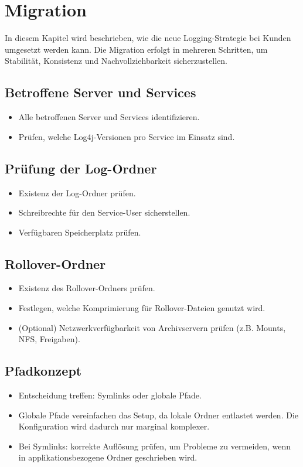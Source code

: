 \chapter{Migration}
\label{chap:migration}

In diesem Kapitel wird beschrieben, wie die neue Logging-Strategie bei Kunden umgesetzt werden kann.  
Die Migration erfolgt in mehreren Schritten, um Stabilität, Konsistenz und Nachvollziehbarkeit sicherzustellen.

\section{Betroffene Server und Services}
\begin{itemize}
    \item Alle betroffenen Server und Services identifizieren.
    \item Prüfen, welche Log4j-Versionen pro Service im Einsatz sind.
\end{itemize}

\section{Prüfung der Log-Ordner}
\begin{itemize}
    \item Existenz der Log-Ordner prüfen.
    \item Schreibrechte für den Service-User sicherstellen.
    \item Verfügbaren Speicherplatz prüfen.
\end{itemize}

\section{Rollover-Ordner}
\begin{itemize}
    \item Existenz des Rollover-Ordners prüfen.
    \item Festlegen, welche Komprimierung für Rollover-Dateien genutzt wird.
    \item (Optional) Netzwerkverfügbarkeit von Archivservern prüfen (z.B. Mounts, NFS, Freigaben).
\end{itemize}

\section{Pfadkonzept}
\begin{itemize}
    \item Entscheidung treffen: Symlinks oder globale Pfade.
    \item Globale Pfade vereinfachen das Setup, da lokale Ordner entlastet werden. Die Konfiguration wird dadurch nur marginal komplexer.
    \item Bei Symlinks: korrekte Auflösung prüfen, um Probleme zu vermeiden, wenn in applikationsbezogene Ordner geschrieben wird.
\end{itemize}

